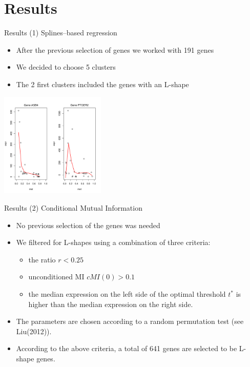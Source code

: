\documentclass[handout]{beamer}
\begin{document}
\section{Results}

\begin {frame}{Results (1) Splines--based regression}
\begin {itemize}
\item After the previous selection of genes we worked with 191 genes
\item We decided to choose 5 clusters
\item The 2 first clusters included the genes with an L-shape
\end{itemize}
\begin{center}
\includegraphics[height=5cm]{./images/grafic_two_patterns.pdf}
\end{center}
\end{frame}

\begin{frame}{Results (2) Conditional Mutual Information}
\begin {itemize}
\item No previous selection of the genes was needed
\item We filtered for L-shapes using a combination of three criteria:
\begin{itemize}
\item the ratio $r<0.25$
\item unconditioned MI $\mathit{cMI}(0)>0.1$
\item the median expression on the left side of the optimal threshold $t^{\ast}$ is higher
than the median expression on the right side.
\end{itemize}
\item The parameters are chosen according to a random permutation test (see Liu(2012)).
\item According to the above criteria, a total of 641 genes are selected to be L-shape genes.
\end{itemize}
\end{frame}
\end{document}
